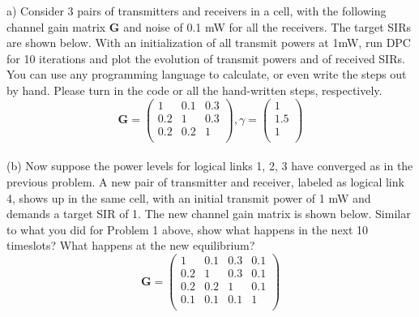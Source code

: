 \documentclass[12pt]{article}
\newenvironment{problem}[2][Problem]{\begin{trivlist}
\item[\hskip \labelsep {\bfseries #1}\hskip \labelsep {\bfseries #2.}]}{\end{trivlist}}
\begin{document}
\begin{problem}{1}	
	(a) Consider 3 pairs of transmitters and receivers in a cell, with the following channel gain matrix \textbf{G} and noise of 0.1 mW for all the receivers. The target SIRs are shown below. With an initialization of all transmit powers at 1mW, run DPC for 10 iterations and plot the evolution of transmit powers and of received SIRs.\\
	You can use any programming language to calculate, or even write the steps out by hand. Please turn in the code or all the hand-written steps, respectively.
	$$	
	\textbf{G} = \begin{pmatrix}1 & 0.1 & 0.3\\0.2 & 1 & 0.3\\ 0.2 & 0.2 & 1 \\\end{pmatrix}, \gamma = \begin{pmatrix}
	1 \\ 1.5 \\ 1\\
	\end{pmatrix}
	$$
	\\
	(b) Now suppose the power levels for logical links 1, 2, 3 have converged as in the previous problem. A new pair of transmitter and receiver, labeled as logical link 4, shows up in the same cell, with an initial transmit power of 1 mW and demands a target SIR of 1. The new channel gain matrix is shown below. Similar to what you did for Problem 1 above, show what happens in the next 10 timeslots? What happens at the new equilibrium?
	$$
	\textbf{G} = \begin{pmatrix}
	 1 & 0.1 & 0.3 & 0.1 \\ 0.2 & 1 & 0.3 & 0.1 \\ 0.2 & 0.2 & 1 & 0.1 \\ 0.1 & 0.1 & 0.1 & 1\\
	\end{pmatrix}
	$$
\end{problem}
\end{document}
